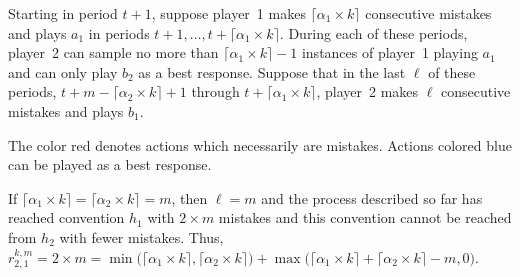 Starting in period $t+1$, suppose player~1 makes $\lceil \alpha_1 \times k \rceil$ consecutive mistakes and plays $a_1$ in periods $t+1, \dots, t+\lceil \alpha_1 \times k \rceil$. During each of these periods,  player~2 can sample no more than $\lceil \alpha_1 \times k \rceil - 1$ instances of player~1 playing $a_1$ and can only play $b_2$ as a best response. 
%
Suppose that in the last $\ell$ of these periods, $t+m-\lceil \alpha_2 \times k \rceil +1$ through $t+\lceil \alpha_1 \times k \rceil$,  player~2 makes $\ell$ consecutive mistakes and plays $b_1$. 



\begin{table}[h]
\caption{Case 2 Example Transition}
  \label{tab:case2exampletransition} 
\centering
{}
\small
The color red denotes actions which necessarily are mistakes. Actions colored blue can be played as a best response.
\end{table}



If $\lceil \alpha_1 \times k \rceil = \lceil \alpha_2 \times k \rceil = m$, then $\ell=m$ and the process described so far has reached convention $h_1$ with $2\times m$ mistakes and this convention cannot be reached from $h_2$ with fewer mistakes. Thus, $r_{2,1}^{k,m} = 2\times m = \min\big(\lceil \alpha_1 \times k \rceil,\lceil \alpha_2 \times k \rceil\big) + \max\big(\lceil\alpha_1\times k\rceil+\lceil \alpha_2 \times k \rceil-m,0\big)$. 

